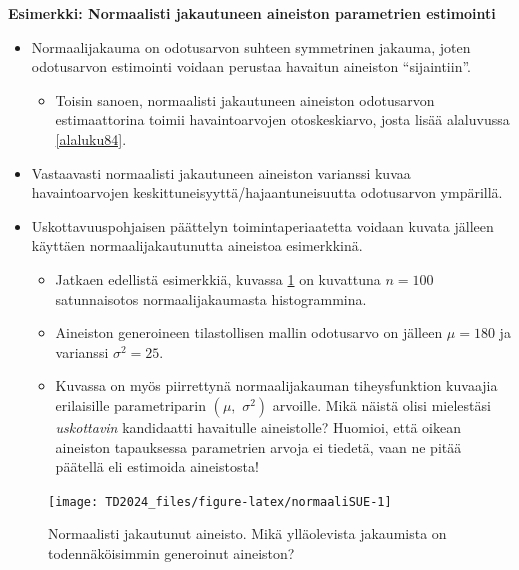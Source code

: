 \documentclass[
]{book}
\providecommand{\tightlist}{%
  \setlength{\itemsep}{0pt}\setlength{\parskip}{0pt}}
\begin{document}
\begin{eblock}{}

\textbf{Esimerkki: Normaalisti jakautuneen aineiston parametrien estimointi}

\begin{itemize}
\item
  Normaalijakauma on odotusarvon suhteen symmetrinen jakauma, joten odotusarvon estimointi voidaan perustaa havaitun aineiston ``sijaintiin''.

  \begin{itemize}
  \tightlist
  \item
    Toisin sanoen, normaalisti jakautuneen aineiston odotusarvon estimaattorina toimii havaintoarvojen otoskeskiarvo, josta lisää alaluvussa \ref{alaluku84}.\\
  \end{itemize}
\item
  Vastaavasti normaalisti jakautuneen aineiston varianssi kuvaa havaintoarvojen keskittuneisyyttä/hajaantuneisuutta odotusarvon ympärillä.
\item
  Uskottavuuspohjaisen päättelyn toimintaperiaatetta voidaan kuvata jälleen käyttäen normaalijakautunutta aineistoa esimerkkinä.

  \begin{itemize}
  \tightlist
  \item
    Jatkaen edellistä esimerkkiä, kuvassa \ref{fig:normaaliSUE} on kuvattuna \(n=100\) satunnaisotos normaalijakaumasta histogrammina.
  \item
    Aineiston generoineen tilastollisen mallin odotusarvo on jälleen \(\mu = 180\) ja varianssi \(\sigma^2 = 25\).
  \item
    Kuvassa on myös piirrettynä normaalijakauman tiheysfunktion kuvaajia erilaisille parametriparin \((\mu, \,\, \sigma^2)\) arvoille. Mikä näistä olisi mielestäsi \emph{uskottavin} kandidaatti havaitulle aineistolle? Huomioi, että oikean aineiston tapauksessa parametrien arvoja ei tiedetä, vaan ne pitää päätellä eli estimoida aineistosta!
  \end{itemize}
\end{itemize}

\end{eblock}

\begin{figure}

{\centering \texttt{[image: TD2024\_files/figure-latex/normaaliSUE-1]} 

}

\caption{Normaalisti jakautunut aineisto. Mikä ylläolevista jakaumista on todennäköisimmin generoinut aineiston?}\label{fig:normaaliSUE}
\end{figure}
\end{document}
